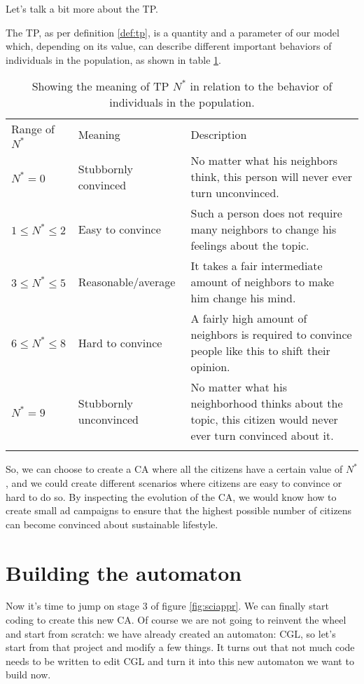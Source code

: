 Let's talk a bit more about the TP.

\begin{proposition}
The TP, as per definition \ref{def:tp}, is a quantity and a parameter of our model which,
depending on its value, can describe different important behaviors of individuals in the population,
as shown in table \ref{tab:meaningn}.
\end{proposition}

%
%
\begin{table}[!t]
\centering
\caption[Meaning of Turning Point]{Showing the meaning of TP $N^\ast$ in relation to the behavior of individuals
in the population.}
\label{tab:meaningn}
%
%
\begin{tabular}{p{}p{}p{}}
\hline\noalign{\smallskip}
Range of $N^\ast$ & Meaning & Description \\
\noalign{\smallskip}\svhline\noalign{\smallskip}
$N^\ast = 0$ & Stubbornly convinced & No matter what his
neighbors think, this person will never ever turn unconvinced.\\
$1 \leq N^\ast \leq 2$ & Easy to convince  & Such a person does not
require many neighbors to change his feelings about the topic.\\
$3 \leq N^\ast \leq 5$ & Reasonable/average & It takes a fair
intermediate amount of neighbors to make him change his mind.\\
$6 \leq N^\ast \leq 8$ & Hard to convince & A fairly high amount of
neighbors is required to convince people like this to shift their opinion.\\
$N^\ast = 9$ & Stubbornly unconvinced & No matter what his
neighborhood thinks about the topic, this citizen would never ever turn convinced about it.\\
\noalign{\smallskip}\hline\noalign{\smallskip}
\end{tabular}
\end{table}
%

So, we can choose to create a CA where all the citizens have a certain value of $N^\ast$, and
we could create different scenarios where citizens are easy to convince or hard to do so.
By inspecting the evolution of the CA, we would know how to create small ad campaigns to ensure
that the highest possible number of citizens can become convinced about sustainable lifestyle.

\section{Building the automaton}
Now it's time to jump on stage 3 of figure \ref{fig:sciappr}. We can finally start coding to
create this new CA. Of course we are not going to reinvent the wheel and start from scratch: we
have already created an automaton: CGL, so let's start from that project and modify a few things.
It turns out that not much code needs to be written to edit CGL and turn it into this new
automaton we want to build now.

